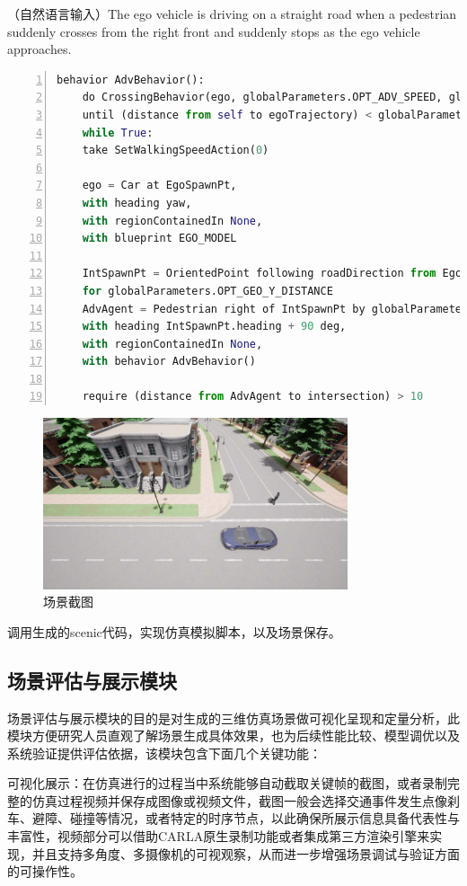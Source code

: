 \indent （自然语言输入）The ego vehicle is driving on a straight road when a pedestrian suddenly crosses from the right front and suddenly stops as the ego vehicle approaches.\\
\begin{lstlisting}[language=Python, caption={场景关键代码示例}, label={lst:scenic_key}, numbers=left, xleftmargin=2em]
	behavior AdvBehavior():
	do CrossingBehavior(ego, globalParameters.OPT_ADV_SPEED, globalParameters.OPT_ADV_DISTANCE) 
	until (distance from self to egoTrajectory) < globalParameters.OPT_STOP_DISTANCE
	while True:
	take SetWalkingSpeedAction(0)
	
	ego = Car at EgoSpawnPt,
	with heading yaw,
	with regionContainedIn None,
	with blueprint EGO_MODEL
	
	IntSpawnPt = OrientedPoint following roadDirection from EgoSpawnPt 
	for globalParameters.OPT_GEO_Y_DISTANCE
	AdvAgent = Pedestrian right of IntSpawnPt by globalParameters.OPT_GEO_X_DISTANCE,
	with heading IntSpawnPt.heading + 90 deg,
	with regionContainedIn None,
	with behavior AdvBehavior()
	
	require (distance from AdvAgent to intersection) > 10
\end{lstlisting}
\begin{figure}[H]
	\centering
	\includegraphics[width=0.8\textwidth]{"images/场景5.pdf"}
	\caption{场景截图}
	\label{}
\end{figure}
调用生成的scenic代码，实现仿真模拟脚本，以及场景保存。
\subsection{场景评估与展示模块}

场景评估与展示模块的目的是对生成的三维仿真场景做可视化呈现和定量分析，此模块方便研究人员直观了解场景生成具体效果，也为后续性能比较、模型调优以及系统验证提供评估依据，该模块包含下面几个关键功能：


可视化展示：在仿真进行的过程当中系统能够自动截取关键帧的截图，或者录制完整的仿真过程视频并保存成图像或视频文件，截图一般会选择交通事件发生点像刹车、避障、碰撞等情况，或者特定的时序节点，以此确保所展示信息具备代表性与丰富性，视频部分可以借助CARLA原生录制功能或者集成第三方渲染引擎来实现，并且支持多角度、多摄像机的可视观察，从而进一步增强场景调试与验证方面的可操作性。

